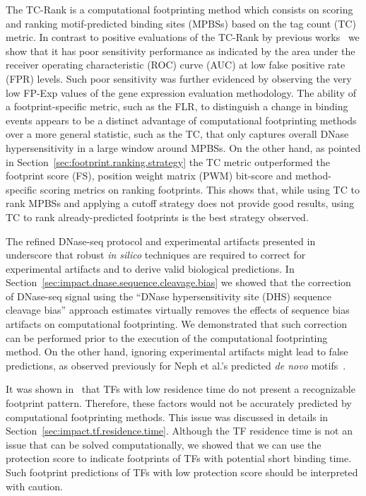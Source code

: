 The TC-Rank is a computational footprinting method which consists on scoring and ranking motif-predicted binding sites (MPBSs) based on the tag count (TC) metric. In contrast to positive evaluations of the TC-Rank by previous works~\citep{cuellar2012,he2014} we show that it has poor sensitivity performance as indicated by the area under the receiver operating characteristic (ROC) curve (AUC) at low false positive rate (FPR) levels. Such poor sensitivity was further evidenced by observing the very low FP-Exp values of the gene expression evaluation methodology. The ability of a footprint-specific metric, such as the FLR, to distinguish a change in binding events appears to be a distinct advantage of computational footprinting methods over a more general statistic, such as the TC, that only captures overall DNase hypersensitivity in a large window around MPBSs. On the other hand, as pointed in Section~\ref{sec:footprint.ranking.strategy} the TC metric outperformed the footprint score (FS), position weight matrix (PWM) bit-score and method-specific scoring metrics on ranking footprints. This shows that, while using TC to rank MPBSs and applying a cutoff strategy does not provide good results, using TC to rank already-predicted footprints is the best strategy observed.

The refined DNase-seq protocol and experimental artifacts presented in~\cite{he2014} underscore that robust \emph{in silico} techniques are required to correct for experimental artifacts and to derive valid biological predictions. In Section~\ref{sec:impact.dnase.sequence.cleavage.bias} we showed that the correction of DNase-seq signal using the ``DNase hypersensitivity site (DHS) sequence cleavage bias'' approach estimates virtually removes the effects of sequence bias artifacts on computational footprinting. We demonstrated that such correction can be performed prior to the execution of the computational footprinting method. On the other hand, ignoring experimental artifacts might lead to false predictions, as observed previously for Neph et al.'s predicted \emph{de novo} motifs~\citep{neph2012a,he2014}. 

It was shown in~\cite{sung2014} that TFs with low residence time do not present a recognizable footprint pattern. Therefore, these factors would not be accurately predicted by computational footprinting methods. This issue was discussed in details in Section~\ref{sec:impact.tf.residence.time}. Although the TF residence time is not an issue that can be solved computationally, we showed that we can use the protection score to indicate footprints of TFs with potential short binding time. Such footprint predictions of TFs with low protection score should be interpreted with caution.

